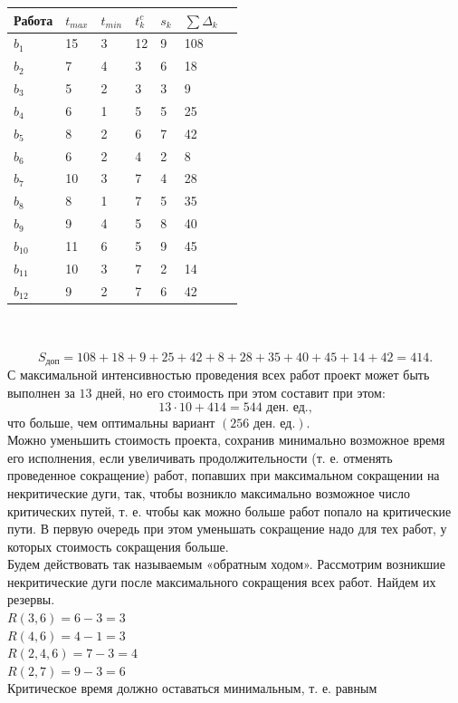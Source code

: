 \documentclass[a4paper, 12pt]{report}
\begin{document}
	\begin{tabular}{ |p{2cm}||p{1cm}||p{1cm}||p{1cm}||p{3cm}||p{1cm}||p{2cm}|}
		\hline
		Работа & $t_{max}$ & $t_{min}$ & $t_k^c$ & $s_k$ & $\sum \Delta_k$\\
		\hline
		$b_1$ & 15 & 3 & 12 & 9 & 108\\
		$b_2$ & 7 & 4 & 3 & 6 & 18\\
		$b_3$ & 5 & 2 & 3 & 3 & 9\\
		$b_4$ & 6 & 1 & 5 & 5 & 25\\
		$b_5$ & 8 & 2 & 6 & 7 & 42\\
		$b_6$ & 6 & 2 & 4 & 2 & 8\\
		$b_7$ & 10 & 3 & 7 & 4 & 28\\
		$b_8$ & 8 & 1 & 7 & 5 & 35\\
		$b_9$ & 9 & 4 & 5 & 8 & 40\\
		$b_{10}$ & 11 & 6 & 5 & 9 & 45\\
		$b_{11}$ & 10 & 3 & 7 & 2 & 14\\
		$b_{12}$& 9 & 2 & 7 & 6 & 42\\
		\hline
	\end{tabular}\\\\
	$$S_\text{доп}=108+18+9+25+42+8+28+35+40+45+14+42=414.$$
	С максимальной интенсивностью проведения всех работ проект может быть выполнен за $13$ дней, но его стоимость при этом составит при этом:
	$$13\cdot 10+414=544 \text{ ден. ед.,}$$
	что больше, чем оптимальны вариант $(256\text{ ден. ед.})$.\\
	Можно уменьшить стоимость проекта, сохранив минимально возможное время его исполнения, если увеличивать продолжительности (т. е. отменять проведенное сокращение) работ, попавших при максимальном сокращении на некритические дуги, так, чтобы возникло максимально возможное число критических путей, т. е. чтобы как можно больше работ попало на критические пути. В первую очередь
	при этом уменьшать сокращение надо для тех работ, у которых стоимость сокращения больше.\\
	Будем действовать так называемым «обратным ходом». Рассмотрим возникшие некритические дуги после максимального сокращения всех работ. Найдем их резервы.\\
	$R(3,6)=6-3=3$\\
	$R(4,6)=4-1=3$\\
	$R(2,4,6)=7-3=4$\\
	$R(2,7)=9-3=6$\\
	Критическое время должно оставаться минимальным, т. е. равным
\end{document}
